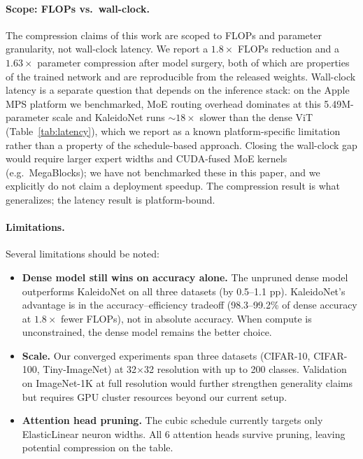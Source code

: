\paragraph{Scope: FLOPs vs.\ wall-clock.}
The compression claims of this work are scoped to FLOPs and parameter granularity, not wall-clock latency. We report a $1.8{\times}$ FLOPs reduction and a $1.63{\times}$ parameter compression after model surgery, both of which are properties of the trained network and are reproducible from the released weights. Wall-clock latency is a separate question that depends on the inference stack: on the Apple MPS platform we benchmarked, MoE routing overhead dominates at this 5.49M-parameter scale and KaleidoNet runs ${\sim}18{\times}$ slower than the dense ViT (Table~\ref{tab:latency}), which we report as a known platform-specific limitation rather than a property of the schedule-based approach. Closing the wall-clock gap would require larger expert widths and CUDA-fused MoE kernels (e.g.\ MegaBlocks); we have not benchmarked these in this paper, and we explicitly do not claim a deployment speedup. The compression result is what generalizes; the latency result is platform-bound.

\paragraph{Limitations.}
Several limitations should be noted:
\begin{itemize}
    \item \textbf{Dense model still wins on accuracy alone.} The unpruned dense model outperforms KaleidoNet on all three datasets (by 0.5--1.1 pp). KaleidoNet's advantage is in the accuracy--efficiency tradeoff (98.3--99.2\% of dense accuracy at $1.8{\times}$ fewer FLOPs), not in absolute accuracy. When compute is unconstrained, the dense model remains the better choice.
    \item \textbf{Scale.} Our converged experiments span three datasets (CIFAR-10, CIFAR-100, Tiny-ImageNet) at 32$\times$32 resolution with up to 200 classes. Validation on ImageNet-1K at full resolution would further strengthen generality claims but requires GPU cluster resources beyond our current setup.
    \item \textbf{Attention head pruning.} The cubic schedule currently targets only ElasticLinear neuron widths. All 6 attention heads survive pruning, leaving potential compression on the table.
\end{itemize}

